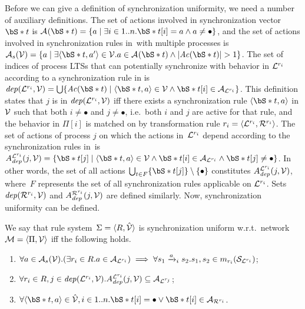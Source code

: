 Before we can give a definition of synchronization uniformity, we need a number of auxiliary definitions.
The set of actions involved in synchronization vector~$\vectornot{t}$ is ${\actions{}}(\vectornot{t}) = \{ a \mid \exists i \in 1..n. \vectornot{t}[i] = a \wedge a \neq \bullet \}$,
and the set of actions involved in synchronization rules in~\synchrules with multiple processes is $\syncactions (\synchrules) = \{a \mid \exists \langle \vectornot{t},a' \rangle \in \synchrules. a \in {\actions{}}(\vectornot{t}) \wedge |{\it Ac}(\vectornot{t})|>1 \}$.
The set of indices of process LTSs that can potentially synchronize with behavior in $\mathcal{L}^{{r_i}}$ according to a synchronization rule in \synchrules is $\inv(\Llts^\ri, \synchrules) = \bigcup \{ {\it Ac}(\vectornot{t}) \mid \syncruletuple \in \synchrules \wedge \vectornot{t}[i] \in \actions{\Llts^\ri} \}$.
This definition states that $j$ is in ${\it dep}(\mathcal{L}^{{r_i}}, {\mathcal{V}})$ iff there exists a synchronization rule $\syncruletuple$ in ${\mathcal{V}}$ such that both $i \neq \bullet$ and $j \neq \bullet$, i.e.\ both $i$ and $j$ are active for that rule, and the behavior in $\Pi[i]$ is matched on by transformation rule ${r_i} = \langle \mathcal{L}^{r_i}, \mathcal{R}^{r_i} \rangle$.
The set of actions of process $j$ on which the actions in~$\mathcal{L}^{{r_i}}$ depend according to the synchronization rules in~\synchrules is $\dep^{\Llts^\ri}(j, \synchrules) = \{ \vectornot{t}[j] \mid \syncruletuple \in \synchrules \wedge \vectornot{t}[i] \in \actions{\Llts^\ri} \wedge \vectornot{t}[j] \neq \bullet \}$.
In other words, the set of all actions $\bigcup_{t \in F} \{\vectornot{t}[j] \} \setminus \{\bullet\}$ constitutes $A_{\it dep}^{\mathcal{L}^{{r_i}}}(j, {\mathcal{V}})$, where~$F$ represents the set of all synchronization rules applicable on $\mathcal{L}^{{r_i}}$.
Sets ${\it dep}(\mathcal{R}^{{r_i}}, {\mathcal{V}})$ and $A_{\it dep}^{\mathcal{R}^{{r_i}}}(j, {\mathcal{V}})$ are defined similarly.
Now, synchronization uniformity can be defined.

\begin{definition}
\label{def:lts-transformation:uniformity}
We say that rule system~$\Sigma = \langle R,\hat{{\mathcal{V}}} \rangle$ is synchronization uniform w.r.t.\ network~$\mathcal{M} = \langle \Pi, {\mathcal{V}} \rangle$ iff the following holds.
\begin{enumerate}
\item
$\forall a \in {\mathcal{A}_{s}} ({\mathcal{V}}). (\exists {r_i} \in R. a \in {\mathcal{A}_{\ensuremath{\mathcal{L}}^{\ensuremath{{r_i}}}}}) \implies \forall s_1\xrightarrow{a}_{i} s_2 . s_1, s_2 \in m_{{r_i}}({\mathcal{S}_{\mathcal{L}^{{r_i}}}})$;
\item
$\forall {r_i} \in R, j \in {\it dep}(\mathcal{L}^{{r_i}}, {\mathcal{V}}). A_{\it dep}^{\mathcal{L}^{{r_i}}}(j, {\mathcal{V}}) \subseteq {\mathcal{A}_{\ensuremath{\mathcal{L}}^{\ensuremath{{r_j}}}}}$;
\item
$\forall \langle\vectornot{t},a\rangle \in \hat\synchrules, i \in 1..n. \vectornot{t}[i] = \bullet \vee \vectornot{t}[i] \in \actions{\Rlts^\ri}$.
\end{enumerate}
\end{definition}

